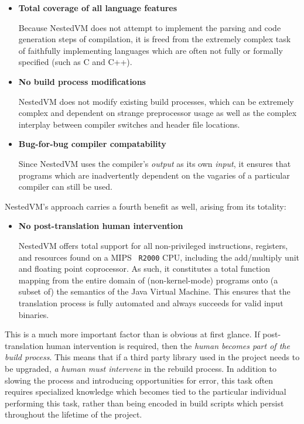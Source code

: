 \documentclass{acmconf}
\begin{document}
\begin{itemize}
\item {\bf Total coverage of all language features}

      Because NestedVM does not attempt to implement the parsing and
      code generation steps of compilation, it is freed from the
      extremely complex task of faithfully implementing languages
      which are often not fully or formally specified (such as C and
      C++).

\item {\bf No build process modifications}

      NestedVM does not modify existing build processes, which can be
      extremely complex and dependent on strange preprocessor usage as
      well as the complex interplay between compiler switches and
      header file locations.

\item {\bf Bug-for-bug compiler compatability}

      Since NestedVM uses the compiler's {\it output} as its own {\it
      input}, it ensures that programs which are inadvertently
      dependent on the vagaries of a particular compiler can still be
      used.

\end{itemize}

NestedVM's approach carries a fourth benefit as well, arising from its
totality:

\begin{itemize}
\item {\bf No post-translation human intervention}

      NestedVM offers total support for all non-privileged
      instructions, registers, and resources found on a MIPS {\tt
      R2000} CPU, including the add/multiply unit and floating point
      coprocessor.  As such, it constitutes a total function mapping
      from the entire domain of (non-kernel-mode) programs onto (a
      subset of) the semantics of the Java Virtual Machine.  This
      ensures that the translation process is fully automated and
      always succeeds for valid input binaries.
\end{itemize}

This is a much more important factor than is obvious at first glance.
If post-translation human intervention is required, then the {\it
human becomes part of the build process}.  This means that if a third
party library used in the project needs to be upgraded, {\it a human
must intervene} in the rebuild process.  In addition to slowing the
process and introducing opportunities for error, this task often
requires specialized knowledge which becomes tied to the particular
individual performing this task, rather than being encoded in build
scripts which persist throughout the lifetime of the project.
\end{document}
